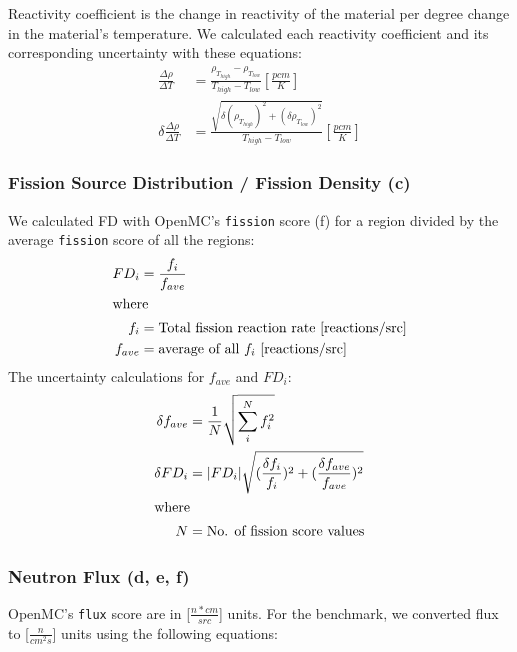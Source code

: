 Reactivity coefficient is the change in reactivity of the material per degree 
change in the material's temperature. 
We calculated each reactivity coefficient and its corresponding uncertainty 
with these equations: 
\begin{align}
    \frac{\Delta \rho}{\Delta T} &= 
    \frac{\rho_{T_{high}}-\rho_{T_{low}}}{T_{high}-T_{low}} [\frac{pcm}{K}] \\
    \delta \frac{\Delta \rho}{\Delta T} &= 
    \frac{\sqrt{\delta (\rho_{T_{high}})^2+(\delta \rho_{T_{low}})^2}}{T_{high}-T_{low}} [\frac{pcm}{K}] 
\end{align}

\subsubsection{Fission Source Distribution / Fission Density (c)}
We calculated \gls{FD} with OpenMC's \texttt{fission} score (f) for a region 
divided by the average \texttt{fission} score of all the regions:
\begin{align}
    FD_i &=  \frac{f_i}{f_{ave}} \\
    \intertext{where}
    f_i &= \mbox{Total fission reaction rate [reactions/src]} \nonumber \\
    f_{ave} &= \mbox{average of all $f_i$ [reactions/src]} \nonumber
\end{align}
The uncertainty calculations for $f_{ave}$ and $FD_i$: 
\begin{align}
    \delta f_{ave} &= \frac{1}{N}\sqrt{\sum_i^Nf_i^2} \\
    \delta FD_i &= |FD_i| \sqrt{(\frac{\delta f_i}{f_i})^2+(\frac{\delta f_{ave}}{f_{ave}})^2} \\
    \intertext{where}
    N &= \mbox{No. of fission score values} \nonumber
\end{align}

\subsubsection{Neutron Flux (d, e, f)}
OpenMC's \texttt{flux} score are in [$\frac{n * cm}{src}$] units. 
For the benchmark, we converted flux to [$\frac{n}{cm^2s}$] units
using the following equations:  


